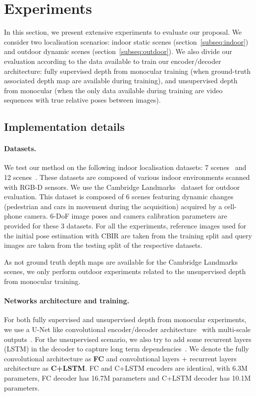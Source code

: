 \section{Experiments}
\label{seq:results}

In this section, we present extensive experiments to evaluate our proposal. We consider two localisation scenarios: indoor static scenes (section~\ref{subseq:indoor}) and outdoor dynamic scenes (section~\ref{subseq:outdoor}). We also divide our evaluation according to the data available to train our encoder/decoder architecture: fully supervised depth from monocular training (when ground-truth associated depth map are available during training), and unsupervised depth from monocular (when the only data available during training are video sequences with true relative poses between images).

\subsection{Implementation details}
\label{subseq:implementation}

\paragraph{Datasets.} We test our method on the following indoor localisation datasets: 7 scenes~\citep{Shotton2013} and 12 scenes~\citep{Valentin2016}. These datasets are composed of various indoor environments scanned with RGB-D sensors. We use the Cambridge Landmarks~\citep{Kendall2015} dataset for outdoor evaluation. This dataset is composed of 6 scenes featuring dynamic changes (pedestrian and cars in movement during the acquisition) acquired by a cell-phone camera. 6-DoF image poses and camera calibration parameters are provided for these 3 datasets. For all the experiments, reference images used for the initial pose estimation with CBIR are taken from the training split and query images are taken from the testing split of the respective datasets.

As not ground truth depth maps are available for the Cambridge Landmarks scenes, we only perform outdoor experiments related to the unsupervised depth from monocular training.

\paragraph{Networks architecture and training.} For both fully supervised and unsupervised depth from monocular experiments, we use a U-Net like convolutional encoder/decoder architecture~\citep{Isola2017} with multi-scale outputs~\citep{Godard2017}. For the unsupervised scenario, we also try to add some recurrent layers (LSTM) in the decoder to capture long term dependencies~\citep{Visin2015, Li2016b}. We denote the fully convolutional architecture as \textbf{FC} and convolutional layers + recurrent layers architecture as \textbf{C+LSTM}. FC and C+LSTM encoders are identical, with 6.3M parameters, FC decoder has 16.7M parameters and C+LSTM decoder has 10.1M parameters.

